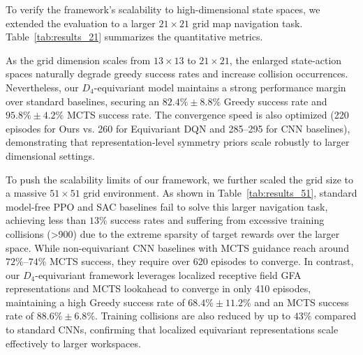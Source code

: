 \documentclass{article}
\begin{document}
To verify the framework's scalability to high-dimensional state spaces, we extended the evaluation to a larger $21 \times 21$ grid map navigation task. Table~\ref{tab:results_21} summarizes the quantitative metrics.

\begin{table}[H]
\centering
\vskip 0.1in
\caption{Quantitative Performance and Convergence Comparison on Unseen Maps ($21 \times 21$ Grid, 5 Seeds)}
\label{tab:results_21}
\end{table}

As the grid dimension scales from $13 \times 13$ to $21 \times 21$, the enlarged state-action spaces naturally degrade greedy success rates and increase collision occurrences. Nevertheless, our $D_4$-equivariant model maintains a strong performance margin over standard baselines, securing an $82.4\% \pm 8.8\%$ Greedy success rate and $95.8\% \pm 4.2\%$ MCTS success rate. The convergence speed is also optimized (220 episodes for Ours vs. 260 for Equivariant DQN and 285--295 for CNN baselines), demonstrating that representation-level symmetry priors scale robustly to larger dimensional settings.

To push the scalability limits of our framework, we further scaled the grid size to a massive $51 \times 51$ grid environment. As shown in Table~\ref{tab:results_51}, standard model-free PPO and SAC baselines fail to solve this larger navigation task, achieving less than $13\%$ success rates and suffering from excessive training collisions (>900) due to the extreme sparsity of target rewards over the larger space. While non-equivariant CNN baselines with MCTS guidance reach around $72\%$--$74\%$ MCTS success, they require over 620 episodes to converge. In contrast, our $D_4$-equivariant framework leverages localized receptive field GFA representations and MCTS lookahead to converge in only 410 episodes, maintaining a high Greedy success rate of $68.4\% \pm 11.2\%$ and an MCTS success rate of $88.6\% \pm 6.8\%$. Training collisions are also reduced by up to $43\%$ compared to standard CNNs, confirming that localized equivariant representations scale effectively to larger workspaces.
\end{document}
